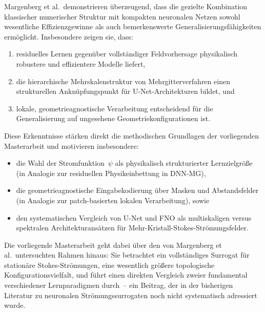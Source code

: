 \documentclass[a4paper,12pt]{article}
\begin{document}
Margenberg et al.\ demonstrieren überzeugend, dass die gezielte Kombination
klassischer numerischer Struktur mit kompakten neuronalen Netzen sowohl
wesentliche Effizienzgewinne als auch bemerkenswerte Generalisierungsfähigkeiten
ermöglicht. Insbesondere zeigen sie, dass:
\begin{enumerate}
    \item residuelles Lernen gegenüber vollständiger Feldvorhersage physikalisch
          robustere und effizientere Modelle liefert,
    \item die hierarchische Mehrskalenstruktur von Mehrgitterverfahren einen
          strukturellen Anknüpfungspunkt für U-Net-Architekturen bildet, und
    \item lokale, geometrieagnostische Verarbeitung entscheidend für die
          Generalisierung auf ungesehene Geometriekonfigurationen ist.
\end{enumerate}

Diese Erkenntnisse stärken direkt die methodischen Grundlagen der vorliegenden
Masterarbeit und motivieren insbesondere:
\begin{itemize}
    \item die Wahl der Stromfunktion~$\psi$ als physikalisch strukturierter
          Lernzielgröße (in Analogie zur residuellen Physikeinbettung
          in DNN-MG),
    \item die geometrieagnostische Eingabekodierung über Masken und
          Abstandsfelder (in Analogie zur patch-basierten lokalen
          Verarbeitung), sowie
    \item den systematischen Vergleich von U-Net und FNO als
          multiskaligen versus spektralen Architekturansätzen
          für Mehr-Kristall-Stokes-Strömungsfelder.
\end{itemize}

Die vorliegende Masterarbeit geht dabei über den von Margenberg et al.\
untersuchten Rahmen hinaus: Sie betrachtet ein vollständiges Surrogat
für stationäre Stokes-Strömungen, eine wesentlich größere topologische
Konfigurationsvielfalt, und führt einen direkten Vergleich zweier
fundamental verschiedener Lernparadigmen durch~-- ein Beitrag,
der in der bisherigen Literatur zu neuronalen Strömungssurrogaten
noch nicht systematisch adressiert wurde.
\end{document}
